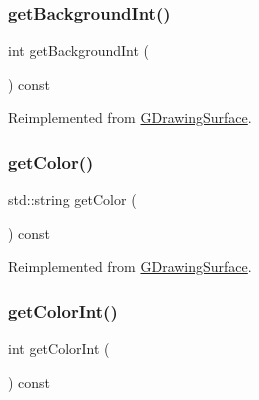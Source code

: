 \mbox{\label{classGConsoleWindow_af66f525e8154dbc8dcd2daecf3728ba9}} 
\subsubsection{\texorpdfstring{get\+Background\+Int()}{getBackgroundInt()}}
{\footnotesize\ttfamily int get\+Background\+Int (\begin{DoxyParamCaption}{ }\end{DoxyParamCaption}) const\hspace{0.3cm}{\ttfamily [virtual]}}



Reimplemented from \mbox{\hyperlink{classGDrawingSurface_a9e827257a55cb8cf4d9de2ec6bcfd7a0}{G\+Drawing\+Surface}}.

\mbox{\label{classGConsoleWindow_a84190923e423247f718a3d9d96a74642}} 
\subsubsection{\texorpdfstring{get\+Color()}{getColor()}}
{\footnotesize\ttfamily std\+::string get\+Color (\begin{DoxyParamCaption}{ }\end{DoxyParamCaption}) const\hspace{0.3cm}{\ttfamily [virtual]}}



Reimplemented from \mbox{\hyperlink{classGDrawingSurface_aa061dfa488c31e18549d64363c1d0e34}{G\+Drawing\+Surface}}.

\mbox{\label{classGConsoleWindow_a3d883dbfb3fbb39dbe8af0f2ed66ff16}} 
\subsubsection{\texorpdfstring{get\+Color\+Int()}{getColorInt()}}
{\footnotesize\ttfamily int get\+Color\+Int (\begin{DoxyParamCaption}{ }\end{DoxyParamCaption}) const\hspace{0.3cm}{\ttfamily [virtual]}}



